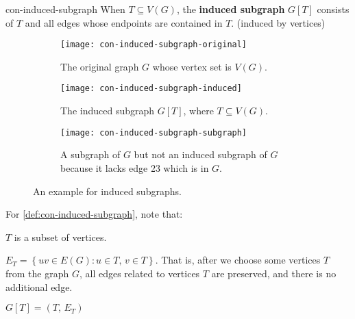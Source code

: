\documentclass[../src/handouts/main.tex]{subfiles}
\begin{document}
\begin{definition}{}{con-induced-subgraph}
  When $T \subseteq V(G)$, the \textbf{induced subgraph} $G[T]$ consists of $T$ and all edges whose endpoints are contained in $T$. (induced by vertices)
\end{definition}

\begin{figure}
  \centering
  \begin{subfigure}[t]{.25\textwidth}
    \centering
    \texttt{[image: con-induced-subgraph-original]}
    \caption{The original graph $G$ whose vertex set is $V(G)$.}
    \label{fig:con-induced-subgraph-original}
  \end{subfigure}
  \hspace{.1\textwidth}
  \begin{subfigure}[t]{.25\textwidth}
    \centering
    \texttt{[image: con-induced-subgraph-induced]}
    \caption{The induced subgraph $G[T]$, where $T \subseteq V(G)$.}
    \label{fig:con-induced-subgraph-induced}
  \end{subfigure}
  \hspace{.1\textwidth}
  \begin{subfigure}[t]{.25\textwidth}
    \centering
    \texttt{[image: con-induced-subgraph-subgraph]}
    \caption{A subgraph of $G$ but not an induced subgraph of $G$ because it lacks edge 23 which is in $G$.}
    \label{fig:con-induced-subgraph-subgraph}
  \end{subfigure}
  \caption{An example for induced subgraphs.}
  \label{fig:con-induced-subgraph}
\end{figure}

For \cref{def:con-induced-subgraph}, note that:
\begin{enumerate*}
  \item $T$ is a subset of vertices.
  \item $E_T = \left\{ uv \in E(G): u \in T,\, v \in T \right\}$. That is, after we choose some vertices $T$ from the graph $G$, all edges related to vertices $T$ are preserved, and there is no additional edge.
  \item $G[T] = (T,\, E_T)$
\end{enumerate*}
\end{document}
